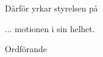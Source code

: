 \documentclass[../_main/handlingar.tex]{subfiles}
\begin{document}
\motionssvar

Därför yrkar styrelsen på
\begin{attsatser}
    \att ... motionen i sin helhet.
\end{attsatser}

\begin{signatures}{1}
    \ist
    \signature{Erik Månsson}{Ordförande}
\end{signatures}
\end{document}
